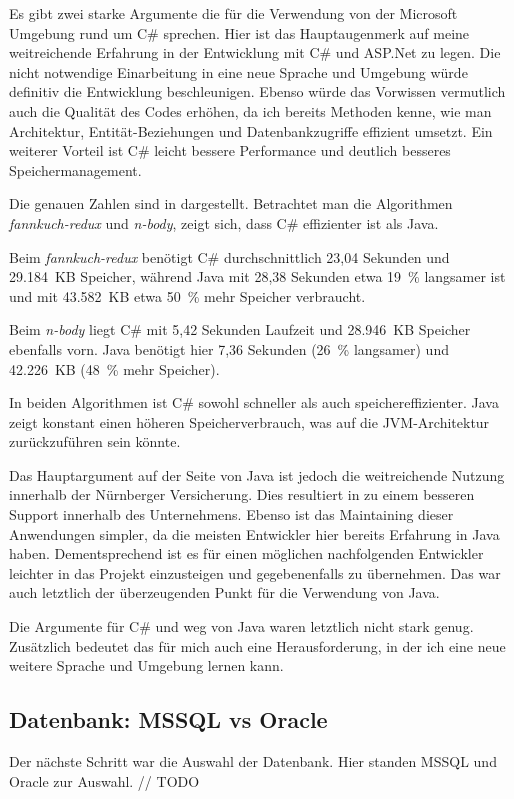 Es gibt zwei starke Argumente die für die Verwendung von der Microsoft Umgebung rund um C\# sprechen.
Hier ist das Hauptaugenmerk auf meine weitreichende Erfahrung in der Entwicklung mit C\# und ASP.Net zu legen.
Die nicht notwendige Einarbeitung in eine neue Sprache und Umgebung würde definitiv die Entwicklung beschleunigen.
Ebenso würde das Vorwissen vermutlich auch die Qualität des Codes erhöhen, da ich bereits Methoden kenne, wie man Architektur, Entität-Beziehungen und Datenbankzugriffe effizient umsetzt.
Ein weiterer Vorteil ist C\# leicht bessere Performance und deutlich besseres Speichermanagement. 

Die genauen Zahlen sind in \cite{Debian2025} dargestellt. 
Betrachtet man die Algorithmen \textit{fannkuch-redux} und \textit{n-body}, zeigt sich, dass C\# effizienter ist als Java.

Beim \textit{fannkuch-redux} benötigt C\# durchschnittlich 23,04 Sekunden und 29.184~KB Speicher, 
während Java mit 28,38 Sekunden etwa 19~\% langsamer ist und mit 43.582~KB etwa 50~\% mehr Speicher verbraucht.

Beim \textit{n-body} liegt C\# mit 5,42 Sekunden Laufzeit und 28.946~KB Speicher ebenfalls vorn. 
Java benötigt hier 7,36 Sekunden (26~\% langsamer) und 42.226~KB (48~\% mehr Speicher).

In beiden Algorithmen ist C\# sowohl schneller als auch speichereffizienter. 
Java zeigt konstant einen höheren Speicherverbrauch, was auf die JVM-Architektur zurückzuführen sein könnte.

Das Hauptargument auf der Seite von Java ist jedoch die weitreichende Nutzung innerhalb der Nürnberger Versicherung. Dies resultiert in zu einem besseren Support innerhalb des Unternehmens.
Ebenso ist das Maintaining dieser Anwendungen simpler, da die meisten Entwickler hier bereits Erfahrung in Java haben. Dementsprechend ist es für einen möglichen nachfolgenden Entwickler leichter
in das Projekt einzusteigen und gegebenenfalls zu übernehmen.
Das war auch letztlich der überzeugenden Punkt für die Verwendung von Java. 

Die Argumente für C\# und weg von Java waren letztlich nicht stark genug.
Zusätzlich bedeutet das für mich auch eine Herausforderung, in der ich eine neue weitere Sprache und Umgebung lernen kann.

\subsection{Datenbank: MSSQL vs Oracle}
Der nächste Schritt war die Auswahl der Datenbank. Hier standen MSSQL und Oracle zur Auswahl.
// TODO
